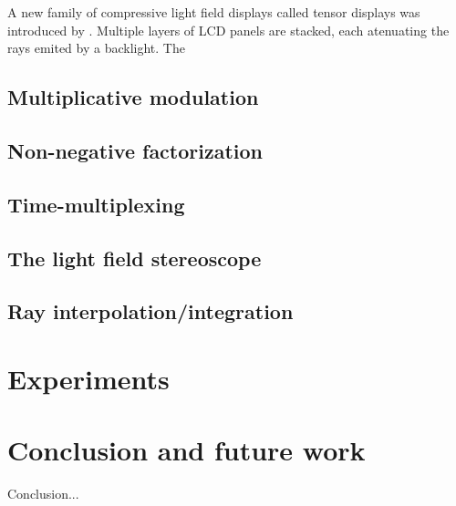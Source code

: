 \documentclass[acmtog,review,anonymous]{acmart}
\begin{document}
A new family of compressive light field displays called tensor displays was introduced by \cite{Wetzstein:2012:TDC:2185520.2185576}. Multiple layers of LCD panels are stacked, each atenuating the rays emited by a backlight. The

\subsection{Multiplicative modulation}
\subsection{Non-negative factorization}
\subsection{Time-multiplexing}
\subsection{The light field stereoscope}
\subsection{Ray interpolation/integration}

\section{Experiments}

\section{Conclusion and future work}

Conclusion...



\end{document}
